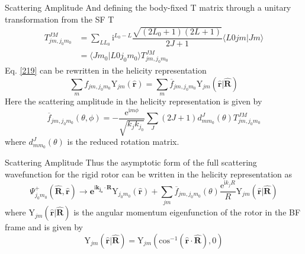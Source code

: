 \documentclass{beamer}
\begin{document}
	\begin{frame}{Scattering Amplitude}
		And defining the body-fixed T matrix through a unitary transformation from the SF T
		\begin{align}
			T^{JM}_{jm,j_0m_0}&=\sum\limits_{LL_0}\mathrm{i}^{L_0-L}\dfrac{\sqrt{(2L_0+1)(2L+1)}}{2J+1}\langle L0jm|Jm\rangle\nonumber\\
			&=\langle Jm_0|L0j_0m_0\rangle T^{JM}_{jm,j_0m_0}
		\end{align}
		Eq. \eqref{219} can be rewritten in the helicity representation
		\begin{equation}
				\sum\limits_m	f_{jm,j_0m_0}\mathrm{Y}_{jm}(\hat{\mathbf{r}})=	\sum\limits_m	\overline{f}_{jm,j_0m_0}\mathrm{Y}_{jm}(\hat{\mathbf{r}}|\hat{\mathbf{R}})
		\end{equation}
		Here the scattering amplitude in the helicity representation is given by
		\begin{equation}
			\overline{f}_{jm,j_0m_0}(\theta,\phi)=-\dfrac{\mathrm{e}^{\mathrm{i}m\phi}}{\sqrt{k_jk_{j_0}}}\sum\limits_J(2J+1)d^J_{mm_0}(\theta)T^{JM}_{jm,j_0m_0}
		\end{equation}
		where $d^J_{mm_0}(\theta)$ is the reduced rotation matrix.
	\end{frame}
	\begin{frame}{Scattering Amplitude}
		Thus the asymptotic form of the full scattering wavefunction for the rigid rotor can be written in the helicity representation as
		\begin{equation}
			\Psi^+_{j_0m_0}(\hat{\mathbf{R}},\hat{\mathbf{r}})\rightarrow\mathbf{e}^{\mathrm{i}\mathbf{k_{j_0}\cdot R}}\mathrm{Y}_{j_0m_0}(\hat{\mathbf{r}})+\sum\limits_{jm}\overline{f}_{jm,j_0m_0}(\theta)\dfrac{\mathrm{e}^{\mathrm{i}k_jR}}{R}\mathrm{Y}_{jm}(\hat{\mathbf{r}}|\hat{\mathbf{R}})
		\end{equation}
		where $\mathrm{Y}_{jm}(\hat{\mathbf{r}}|\hat{\mathbf{R}})$ is the angular momentum eigenfunction of the rotor in the BF frame and is given by
		\begin{equation}
			\mathrm{Y}_{jm}(\hat{\mathbf{r}}|\hat{\mathbf{R}})=\mathrm{Y}_{jm}(\mathrm{cos}^{-1}(\hat{\mathbf{r}}\cdot\hat{\mathbf{R}}),0)
		\end{equation}
	\end{frame}
\end{document}
